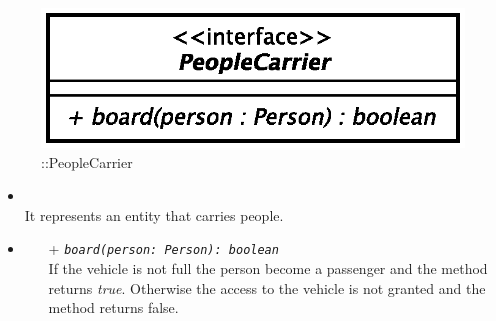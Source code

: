 \begin{figure}[h]
\centering
\includegraphics[scale=0.6,keepaspectratio]{images/solution/app/backend/people_carrier.eps}
\caption{\pActive::PeopleCarrier}
\label{fig:sd-app-people-carrier}
\end{figure}
\FloatBarrier
\begin{itemize}
  \item \textbf{\descr} \\
It represents an entity that carries people.
  \item \textbf{\ops}
  \begin{itemize}
    \item[+]  \texttt{\textit{board(person: Person): boolean}} \\
If the vehicle is not full the person become a passenger and the method 
returns \textit{true}. Otherwise the access to the vehicle is not granted and 
the method returns false.
  \end{itemize}
\end{itemize}
